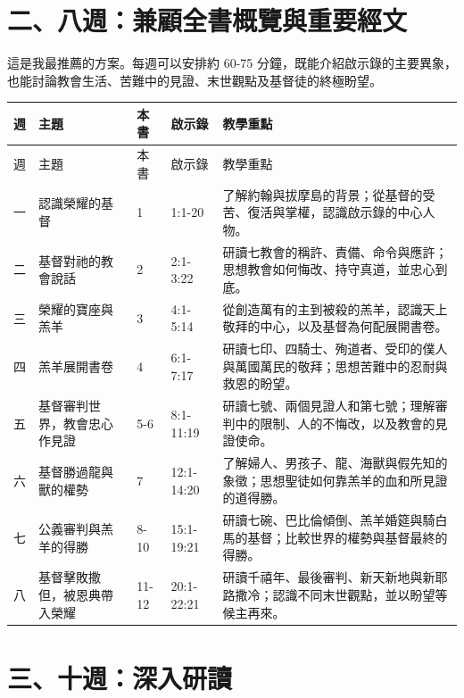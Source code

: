 \section*{二、八週：兼顧全書概覽與重要經文}

這是我最推薦的方案。每週可以安排約 60-75 分鐘，既能介紹啟示錄的主要異象，也能討論教會生活、苦難中的見證、末世觀點及基督徒的終極盼望。
{
\renewcommand{\arraystretch}{1}
\begin{longtable}{
  >{\centering\arraybackslash}p{0.5cm}
  p{2cm}
  p{1cm}
  p{1.5cm}
  p{4cm}
}
週 &
主題 &
本書 &
啟示錄 &
教學重點 \\
\hline
\endfirsthead

週 &
主題 &
本書 &
啟示錄 &
教學重點 \\
\hline
\endhead

一 &
認識榮耀的基督 &
1 &
1:1-20 &
了解約翰與拔摩島的背景；從基督的受苦、復活與掌權，認識啟示錄的中心人物。 \\

二 &
基督對祂的教會說話 &
2 &
2:1-3:22 &
研讀七教會的稱許、責備、命令與應許；思想教會如何悔改、持守真道，並忠心到底。 \\

三 &
榮耀的寶座與羔羊 &
3 &
4:1-5:14 &
從創造萬有的主到被殺的羔羊，認識天上敬拜的中心，以及基督為何配展開書卷。 \\

四 &
羔羊展開書卷 &
4 &
6:1-7:17 &
研讀七印、四騎士、殉道者、受印的僕人與萬國萬民的敬拜；思想苦難中的忍耐與救恩的盼望。 \\

五 &
基督審判世界，教會忠心作見證 &
5-6 &
8:1-11:19 &
研讀七號、兩個見證人和第七號；理解審判中的限制、人的不悔改，以及教會的見證使命。 \\

六 &
基督勝過龍與獸的權勢 &
7 &
12:1-14:20 &
了解婦人、男孩子、龍、海獸與假先知的象徵；思想聖徒如何靠羔羊的血和所見證的道得勝。 \\

七 &
公義審判與羔羊的得勝 &
8-10 &
15:1-19:21 &
研讀七碗、巴比倫傾倒、羔羊婚筵與騎白馬的基督；比較世界的權勢與基督最終的得勝。 \\

八 &
基督擊敗撒但，被恩典帶入榮耀 &
11-12 &
20:1-22:21 &
研讀千禧年、最後審判、新天新地與新耶路撒冷；認識不同末世觀點，並以盼望等候主再來。 \\

\end{longtable}
}


\section*{三、十週：深入研讀}

